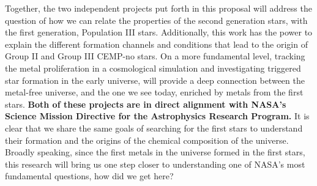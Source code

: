 \documentclass[a4paper, 12pt]{article}
\begin{document}
Together, the two independent projects put forth in this proposal will address the question of how we can relate the properties of the second generation stars, with the first generation, Population III stars. Additionally, this work has the power to explain the different formation channels and conditions that lead to the origin of Group II and Group III CEMP-no stars. On a more fundamental level, tracking the metal proliferation in a cosmological simulation and investigating triggered star formation in the early universe, will provide a deep connection between the metal-free universe, and the one we see today, enriched by metals from the first stars. \textbf{Both of these projects are in direct alignment with NASA's Science Mission Directive for the Astrophysics Research Program.} It is clear that we share the same goals of searching for the first stars to understand their formation and the origins of the chemical composition of the universe. Broadly speaking, since the first metals in the universe formed in the first stars, this research will bring us one step closer to understanding one of NASA's most fundamental questions, how did we get here?




\end{document}
